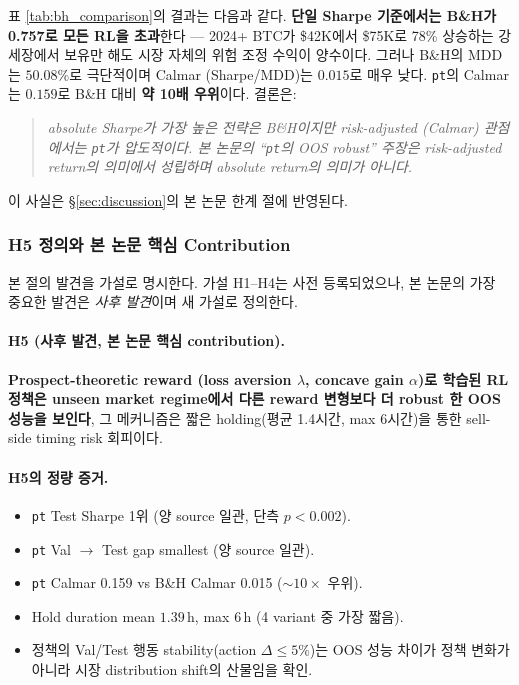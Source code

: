 \documentclass[11pt, a4paper]{article}
\begin{document}
표 \ref{tab:bh_comparison}의 결과는 다음과 같다. \textbf{단일 Sharpe 기준에서는
B\&H가 0.757로 모든 RL을 초과}한다 --- 2024+ BTC가 \$42K에서 \$75K로 78\%
상승하는 강세장에서 보유만 해도 시장 자체의 위험 조정 수익이 양수이다. 그러나
B\&H의 MDD는 $50.08\%$로 극단적이며 Calmar (Sharpe/MDD)는 $0.015$로 매우 낮다.
\texttt{pt}의 Calmar는 $0.159$로 B\&H 대비 \textbf{약 10배 우위}이다. 결론은:

\begin{quote}
\emph{absolute Sharpe가 가장 높은 전략은 B\&H이지만 risk-adjusted (Calmar)
관점에서는 \texttt{pt}가 압도적이다. 본 논문의 ``\texttt{pt}의 OOS robust''
주장은 risk-adjusted return의 의미에서 성립하며 absolute return의 의미가
아니다.}
\end{quote}

이 사실은 \S\ref{sec:discussion}의 본 논문 한계 절에 반영된다.

\subsubsection{H5 정의와 본 논문 핵심 Contribution}
\label{sec:oos_h5}

본 절의 발견을 가설로 명시한다. 가설 H1--H4는 사전 등록되었으나, 본 논문의
가장 중요한 발견은 \emph{사후 발견}이며 새 가설로 정의한다.

\paragraph{H5 (사후 발견, 본 논문 핵심 contribution).}
\textbf{Prospect-theoretic reward (loss aversion $\lambda$, concave gain
$\alpha$)로 학습된 RL 정책은 unseen market regime에서 다른 reward 변형보다
더 robust 한 OOS 성능을 보인다}, 그 메커니즘은 짧은 holding(평균 1.4시간, max
6시간)을 통한 sell-side timing risk 회피이다.

\paragraph{H5의 정량 증거.}
\begin{itemize}[leftmargin=*]
\item \texttt{pt} Test Sharpe 1위 (양 source 일관, 단측 $p < 0.002$).
\item \texttt{pt} Val $\to$ Test gap smallest (양 source 일관).
\item \texttt{pt} Calmar 0.159 vs B\&H Calmar 0.015 ($\sim 10\times$ 우위).
\item Hold duration mean $1.39\,\mathrm{h}$, max $6\,\mathrm{h}$ (4 variant 중 가장
짧음).
\item 정책의 Val/Test 행동 stability(action $\Delta \leq 5\%$)는 OOS 성능 차이가
정책 변화가 아니라 시장 distribution shift의 산물임을 확인.
\end{itemize}
\end{document}
